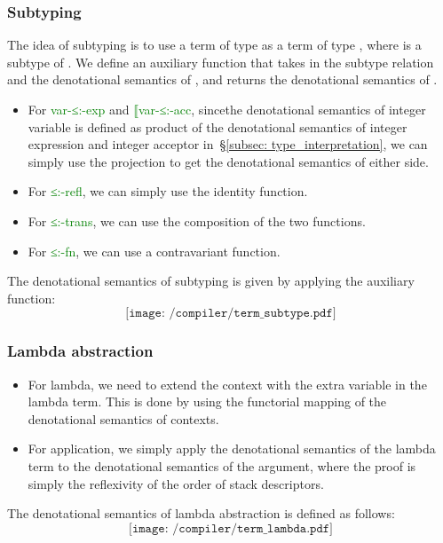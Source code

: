 \documentclass[12pt,a4paper]{report}
\theoremstyle{definition}
\newcommand{\secref}[1]{\S\ref{#1}}
\newcommand{\gn}[1]{\textcolor{green}{#1}}
\newcommand{\gnt}[1]{\gn{\textsf{#1}}}
\begin{document}
        \subsubsection{Subtyping}
        The idea of subtyping is to use a term of type  as a term of type , where  is a subtype of . We define an auxiliary function that takes in the subtype relation  and the denotational semantics of , and returns the denotational semantics of . 
        \begin{itemize}
            \item For \gnt{var-≤:-exp} and \gnt{⟦var-≤:-acc}, sincethe denotational semantics of integer variable is defined as product of the denotational semantics of integer expression and integer acceptor in~\secref{subsec: type_interpretation}, we can simply use the projection to get the denotational semantics of either side.
            \item For \gnt{≤:-refl}, we can simply use the identity function.
            \item For \gnt{≤:-trans}, we can use the composition of the two functions.
            \item For \gnt{≤:-fn}, we can use a contravariant function.
        \end{itemize}
        The denotational semantics of subtyping is given by applying the auxiliary function:
        \[\texttt{[image: /compiler/term\_subtype.pdf]}\]

        \subsubsection{Lambda abstraction}
        \begin{itemize}
            \item For lambda, we need to extend the context \text{\gamma} with the extra variable in the lambda term. This is done by using the functorial mapping of the denotational semantics of contexts.
            \item For application, we simply apply the denotational semantics of the lambda term to the denotational semantics of the argument, where the proof is simply the reflexivity of the order of stack descriptors.
        \end{itemize}
        The denotational semantics of lambda abstraction is defined as follows:
        \[\texttt{[image: /compiler/term\_lambda.pdf]}\]
\end{document}
